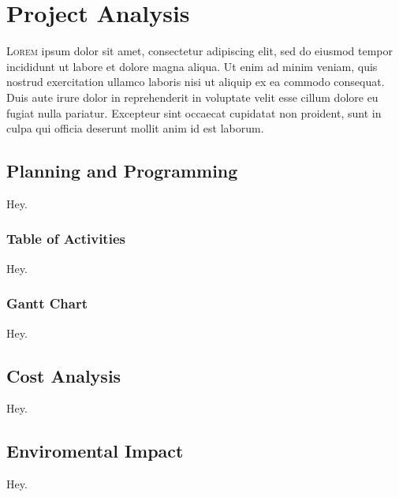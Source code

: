 

\chapter{Project Analysis}\label{cha:analysis}


\lettrine{L}{orem} ipsum dolor sit amet, consectetur
adipiscing elit, sed do eiusmod tempor incididunt ut labore et dolore magna
aliqua. Ut enim ad minim veniam, quis nostrud exercitation ullamco laboris nisi
ut aliquip ex ea commodo consequat. Duis aute irure dolor in reprehenderit in
voluptate velit esse cillum dolore eu fugiat nulla pariatur. Excepteur sint
occaecat cupidatat non proident, sunt in culpa qui officia deserunt mollit anim
id est laborum.


\section{Planning and Programming}

Hey.

\subsection{Table of Activities}

Hey.

\subsection{Gantt Chart}

Hey.


\section{Cost Analysis}

Hey.


\section{Enviromental Impact}

Hey.
